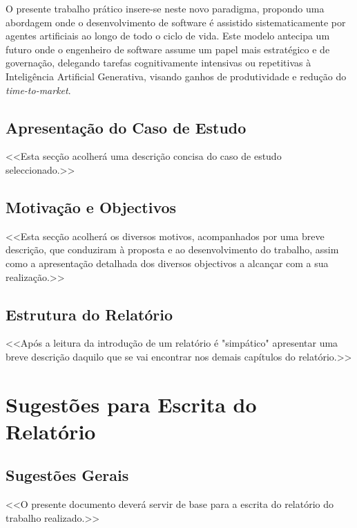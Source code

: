\documentclass[a4paper,12pt]{scrreprt}
\begin{document}
        O presente trabalho prático insere-se neste novo paradigma, propondo uma abordagem onde o desenvolvimento de software é assistido sistematicamente por agentes artificiais ao longo de todo o ciclo de vida. Este modelo antecipa um futuro onde o engenheiro de software assume um papel mais estratégico e de governação, delegando tarefas cognitivamente intensivas ou repetitivas à Inteligência Artificial Generativa, visando ganhos de produtividade e redução do \textit{time-to-market}.
    \section{Apresentação do Caso de Estudo}
        <<Esta secção acolherá uma descrição concisa do caso de estudo seleccionado.>>
    \section{Motivação e Objectivos}
        <<Esta secção acolherá os diversos motivos, acompanhados por uma breve descrição, que conduziram à proposta e ao desenvolvimento do trabalho, assim como a apresentação detalhada dos diversos objectivos a alcançar com a sua realização.>>
    \section{Estrutura do Relatório}
        <<Após a leitura da introdução de um relatório é "simpático" apresentar uma breve descrição daquilo que se vai encontrar nos demais capítulos do relatório.>>




\chapter{Sugestões para Escrita do Relatório}

    \section{Sugestões Gerais}
        <<O presente documento deverá servir de base para a escrita do relatório do trabalho realizado.>>\\
\end{document}
